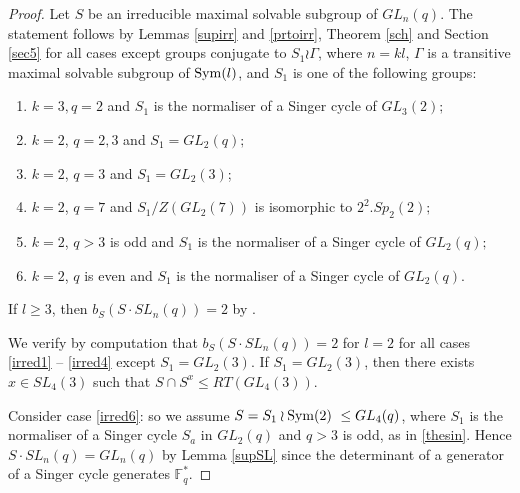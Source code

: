 \begin{proof}
Let $S$ be an  irreducible maximal solvable subgroup of $GL_n(q).$ The statement  follows by Lemmas \ref{supirr} and \ref{prtoirr}, Theorem \ref{sch} and Section  \ref{sec5}
 for all cases except groups  conjugate to $S_1 \wr \Gamma$, where 
$n=kl$, $\Gamma$ is a transitive maximal  solvable subgroup of $\mathrm{Sym}(l)$, and $S_1$ is  one of the following groups:
\begin{enumerate}[label=\alph*)]
\item $k=3, q=2$ and $S_1$ is the normaliser of a Singer cycle of $GL_3(2);$ \label{irred1}
\item $k=2$, $q=2,3$ and $S_1=GL_2(q);$ 
\item $k=2$, $q=3$ and $S_1=GL_2(3)$; 
\item $k=2$, $q=7$ and $S_1/Z(GL_2(7))$ is isomorphic to $2^2.Sp_2(2);$ \label{irred4}
\item $k=2$, $q>3$ is odd and $S_1$ is the normaliser of a Singer cycle of $GL_2(q);$ \label{irred6}
\item $k=2$, $q$ is even and $S_1$ is the normaliser of a Singer cycle of $GL_2(q).$ \label{irred5}

\end{enumerate}
If $l \ge 3$, then $b_S(S \cdot SL_n(q))=2$ by \cite[Theorem 3.1]{james}. %

We verify by computation that $b_S(S \cdot SL_n(q))=2$ for $l=2$ for all cases \ref{irred1} -- \ref{irred4} except  $S_1=GL_2(3)$. If $S_1=GL_2(3)$, then there exists $x \in SL_4(3)$ such that $S \cap S^x \le RT(GL_4(3))$. 

Consider  case \ref{irred6}: so we assume $S=S_1 \wr \mathrm{Sym}(2)\ \le GL_4(q)$, where $S_1$ is the normaliser of a Singer cycle $S_a$ in $GL_2(q)$ and $q>3$ is odd, as in \eqref{thesin}. Hence $S \cdot SL_n(q)=GL_n(q)$ by Lemma \ref{supSL} since the determinant of a generator of a Singer cycle generates $\mathbb{F}_q^*$. %


\end{proof}
